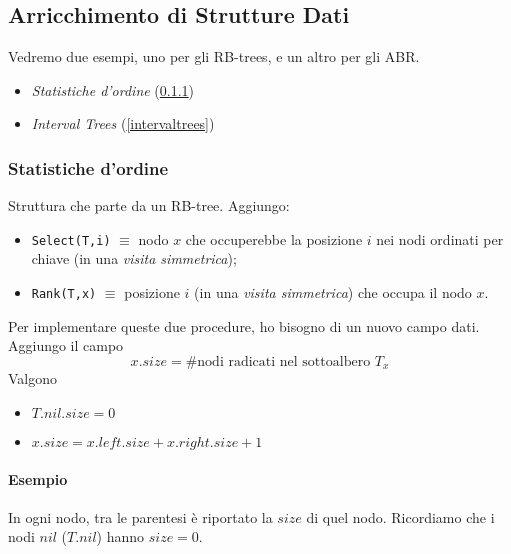 \subsection{Arricchimento di Strutture Dati}

Vedremo due esempi, uno per gli RB-trees, e un altro per gli ABR.
\begin{itemize}[noitemsep]
    \item \emph{Statistiche d'ordine} (\ref{statistichedordine})
    \item \emph{Interval Trees} (\ref{intervaltrees})
\end{itemize}

\subsubsection{Statistiche d'ordine} \label{statistichedordine}
Struttura che parte da un RB-tree. Aggiungo:
\begin{itemize}
    \item \texttt{Select(T,i)} $\equiv$ nodo $x$ che occuperebbe la posizione $i$
        nei nodi ordinati per chiave (in una \emph{visita simmetrica});
    \item \texttt{Rank(T,x)} $\equiv$ posizione $i$ (in una \emph{visita simmetrica}) 
        che occupa il nodo $x$. 
\end{itemize}

Per implementare queste due procedure, ho bisogno di un nuovo campo dati. 
Aggiungo il campo 
$$x.size = \# \text{nodi radicati nel sottoalbero } T_x$$ 
Valgono
\begin{itemize}[label=,noitemsep]
    \item $T.nil.size = 0$
    \item $x.size = x.left.size + x.right.size + 1$
\end{itemize}

\paragraph{Esempio} In ogni nodo, tra le parentesi
è riportato la $size$ di quel nodo. Ricordiamo che i nodi $nil$ ($T.nil$)
hanno $size = 0$.

\begin{center}
\end{center}

